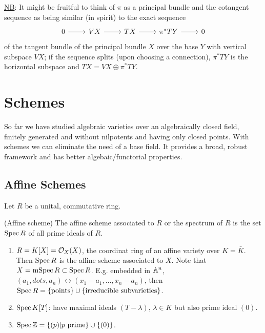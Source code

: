 \documentclass[a4paper,11pt]{article}
\begin{document}
{					\noindent\underline{NB}: It might be fruitful to think of $\pi$ as a principal bundle and the cotangent sequence as being similar (in spirit) to the exact sequence
					\begin{equation*}
						\begin{tikzcd}
							0\ar[r] & VX\ar[r] & TX\ar[r] & \pi^\ast TY\ar[r] & 0
						\end{tikzcd}
					\end{equation*}
					of the tangent bundle of the principal bundle $X$ over the base $Y$ with vertical subspace $VX$; if the sequence splits (upon choosing a connection), $\pi^\ast TY$ is the horizontal subspace and $TX=VX\oplus
					\pi^\ast TY$.
				}



	\section{Schemes}

		So far we have studied algebraic varieties over an algebraically closed field, finitely generated and without nilpotents and having only closed points. With schemes we can eliminate the need of a base field. It provides a broad, robust framework and has better algebaic/functorial properties.
		
		\subsection{Affine Schemes}

			Let $R$ be a unital, commutative ring.

			\begin{defi}(Affine scheme)
				The affine scheme associated to $R$ or the spectrum of $R$ is the set $\spec R$ of all prime ideals of $R$.
			\end{defi}

			\begin{eg}
				\begin{enumerate}
					\item $R=K[X]=\O_X(X)$, the coordinat ring of an affine variety over $K=\bar{K}$. Then $\spec R$ is the affine scheme associated to $X$. Note that $X=\msp R\subset\spec R$. E.g. embedded in $\AA^n$, $(a_1,
					dots,a_n)\leftrightarrow (x_1-a_1,\dots,x_n-a_n)$, then $\spec R=\{\text{points}\}\cup\{\text{irreducible subvarieties}\}$.
					\item $\spec K[T]$: have maximal ideals $(T-\lambda)$, $\lambda\in K$ but also prime ideal $(0)$.
					\item $\spec\Z=\{(p)|p\text{ prime}\}\cup\{(0)\}$.
				\end{enumerate}
			\end{eg}
\end{document}
